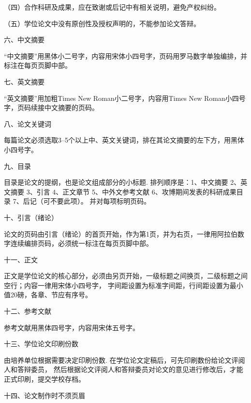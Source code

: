 （四）合作科研及成果，应在致谢或后记中有相关说明，避免产权纠纷。

（五）学位论文中没有原创性及授权声明的，不能参加论文答辩。

{\hei 六、中文摘要}

“中文摘要”用黑体小二号字，内容用宋体小四号字，页码用罗马数字单独编排，并标注在每页页脚中部。

{\hei 七、英文摘要}

“英文摘要”用加粗Times New Roman小二号字，内容用Times New Roman小四号字，页码续接中文摘要的页码。

{\hei 八、论文关键词}

每篇论文必须选取3--5个以上中、英文关键词，排在其论文摘要的左下方，用黑体小四号字。

{\hei 九、目录}

目录是论文的提纲，也是论文组成部分的小标题.
排列顺序是：1、中文摘要 2、英文摘要 3、引言 4、正文章节 5、中外文参考文献 6、攻博期间发表的科研成果目录
7、后记（可不要此项）。 并对每项标明页码。

{\hei 十、引言（绪论）}

论文的页码由引言（绪论）的首页开始，作为第1页，并为右页，一律用阿拉伯数字连续编排页码，必须统一标注在每页页脚中部。

{\hei 十一、正文}

正文是学位论文的核心部分，必须由另页开始，一级标题之间换页，二级标题之间空行；内容一律用宋体小四号字，
字间距设置为标准字间距，行间距设置为最小值20磅，各章、节应有序号。

{\hei 十二、参考文献}

参考文献用黑体四号字，内容用宋体五号字。

{\hei 十三、学位论文印刷份数}

由培养单位根据需要决定印刷份数. 在学位论文定稿后，可先印刷数份给论文评阅人和答辩委员，
然后根据论文评阅人和答辩委员对论文的意见进行修改后，才能正式印刷，提交学校存档。

{\hei 十四、论文制作时不须页眉}
